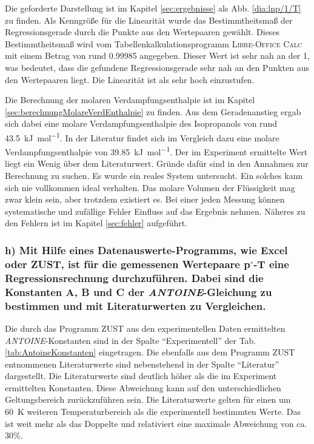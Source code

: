 Die geforderte Darstellung ist im Kapitel \ref{sec:ergebnisse} als Abb. \ref{dia:lnp/1/T} zu finden. Als Kenngröße für die Linearität wurde das Bestimmtheitsmaß der Regressionsgerade durch die Punkte aus den Wertepaaren gewählt. Dieses Bestimmtheitsmaß wird vom Tabellenkalkulationsprogramm \textsc{Libre-Office Calc} mit einem Betrag von rund 0.99985 angegeben. Dieser Wert ist sehr nah an der 1, was bedeutet, dass die gefundene Regressionsgerade sehr nah an den Punkten aus den Wertepaaren liegt. Die Linearität ist als sehr hoch einzustufen. 

Die Berechnung der molaren Verdampfungsenthalpie ist im Kapitel \ref{sec:berechnungMolareVerdEnthalpie} zu finden. Aus dem Geradenanstieg ergab sich dabei eine molare Verdampfungsenthalpie des Isopropanols von rund \SI{43,5}{\kilo\joule\per\mole}. In der Literatur \cite{molareVerdampfungsenthalpieLiteraturwert} findet sich im Vergleich dazu eine molare Verdampfungsenthalpie von \SI{39,85 }{\kilo\joule\per\mole}. Der im Experiment ermittelte Wert liegt ein Wenig über dem Literaturwert. Gründe dafür sind in den Annahmen zur Berechnung zu suchen. Es wurde ein reales System untersucht. Ein solches kann sich nie vollkommen ideal verhalten. Das molare Volumen der Flüssigkeit mag zwar klein sein, aber trotzdem existiert es. Bei einer jeden Messung können systematische und zufällige Fehler Einfluss auf das Ergebnis nehmen. Näheres zu den Fehlern ist im Kapitel \ref{sec:fehler} aufgeführt.
\subsubsection*{h{)} Mit Hilfe eines Datenauswerte-Programms, wie Excel oder ZUST, ist für die gemessenen Wertepaare p$^\circ$-T eine Regressionsrechnung durchzuführen. Dabei sind die Konstanten A, B und C der \textit{ANTOINE}-Gleichung zu bestimmen und mit Literaturwerten zu Vergleichen.}

Die durch das Programm \textsc{ZUST} aus den experimentellen Daten ermittelten \textit{ANTOINE}\--Konstanten sind in der Spalte "`Experimentell"' der Tab.\ref{tab:AntoineKonstanten} eingetragen. Die ebenfalls aus dem Programm ZUST entnommenen Literaturwerte sind nebenstehend in der Spalte "`Literatur"' dargestellt. Die Literaturwerte sind deutlich höher als die im Experiment ermittelten Konstanten. Diese Abweichung kann auf den unterschiedlichen Geltungsbereich zurückzuführen sein. Die Literaturwerte gelten für einen um \SI{60}{\kelvin} weiteren Temperaturbereich als die experimentell bestimmten Werte. Das ist weit mehr als das Doppelte und relativiert eine maximale Abweichung von ca. 30\%.


